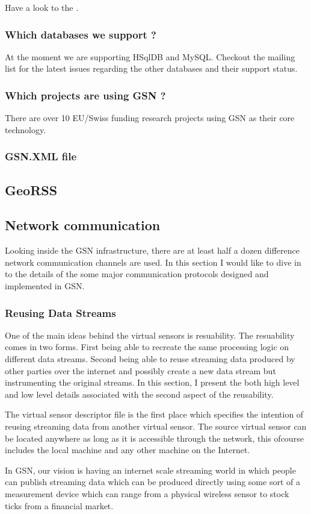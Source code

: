 Have a look to the .

\subsubsection{Which databases we support ?}
At the moment we are supporting HSqlDB and MySQL. Checkout the mailing list for the latest issues regarding the other databases and their
support status.
\subsubsection{Which projects are using GSN ?}
There are over 10 EU/Swiss funding research projects using GSN as their core technology.
\subsubsection{GSN.XML file}
\subsection{GeoRSS}
\subsection{Network communication}
Looking inside the GSN infrastructure, there are at least half a dozen difference network communication channels are used. In this section I would like to dive in to the details
of the some major communication protocols designed and implemented in GSN. 

\subsubsection{Reusing Data Streams}

One of the main ideas behind the virtual sensors is resuability. The resuability comes in two forms.
First being able to recreate the same processing logic on different data streams.
Second being able to reuse streaming data produced by other parties over the internet and possibly create a new data stream but instrumenting the original streams.
In this section, I present the both high level and low level details associated with the second aspect of the reusability.

The virtual sensor descriptor file is the first place which specifies the intention of reusing streaming data from another virtual sensor. The source virtual sensor can be located
anywhere as long as it is accessible through the network, this ofcourse includes the local machine and any other machine on the Internet. 


In GSN, our vision is having an internet scale streaming world in which people can publish streaming data which
can be produced directly using some sort of a measurement device which can range from a physical wireless sensor to stock ticks from a financial market.







